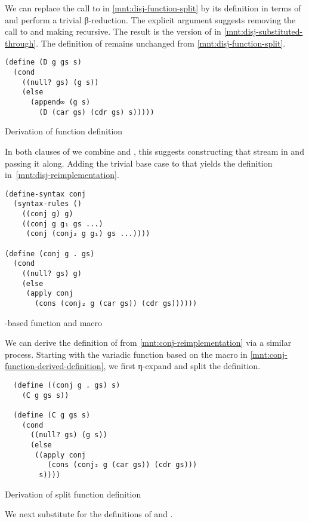 \documentclass[sigplan,draft,balance,pbalance,natbib=false]{acmart}
\begin{document}
\noindent We can replace the call to  in
\cref{mnt:disj-function-split} by its definition in terms of
 and perform a trivial β-reduction. The explicit
 argument suggests removing the call to
 and making  recursive. The result is
the version of  in \cref{mnt:disj-substituted-through}.
The definition of  remains unchanged from
\cref{mnt:disj-function-split}.

\begin{listing}[h]
\begin{verbatim}
(define (D g gs s)
  (cond
    ((null? gs) (g s))
    (else
      (append∞ (g s)
        (D (car gs) (cdr gs) s)))))
\end{verbatim}
  \caption{Derivation of  function definition}
  \label{mnt:disj-substituted-through}
\end{listing}


\noindent In both clauses of  we combine 
and , this suggests constructing that stream
in  and passing it along. Adding the trivial base
case to that  yields the definition
in~\cref{mnt:disj-reimplementation}.

\begin{listing}[h]
\begin{verbatim}
(define-syntax conj
  (syntax-rules ()
    ((conj g) g)
    ((conj g g₁ gs ...)
     (conj (conj₂ g g₁) gs ...))))

(define (conj g . gs)
  (cond
    ((null? gs) g)
    (else
     (apply conj
       (cons (conj₂ g (car gs)) (cdr gs))))))
\end{verbatim}
  \caption{-based  function and macro}
  \label{mnt:conj-function-derived-definition}
\end{listing}

We can derive the definition of  from
\cref{mnt:conj-reimplementation} via a similar process. Starting with
the variadic function based on the macro in
\cref{mnt:conj-function-derived-definition}, we first η-expand and
split the definition.

\begin{listing}[h]
\begin{verbatim}
  (define ((conj g . gs) s)
    (C g gs s))

  (define (C g gs s)
    (cond
      ((null? gs) (g s))
      (else
       ((apply conj
          (cons (conj₂ g (car gs)) (cdr gs)))
        s))))
\end{verbatim}
  \caption{Derivation of split  function definition}
  \label{mnt:conj-substituted-through}
\end{listing}
\noindent We next substitute for the definitions of  and
.
\end{document}
